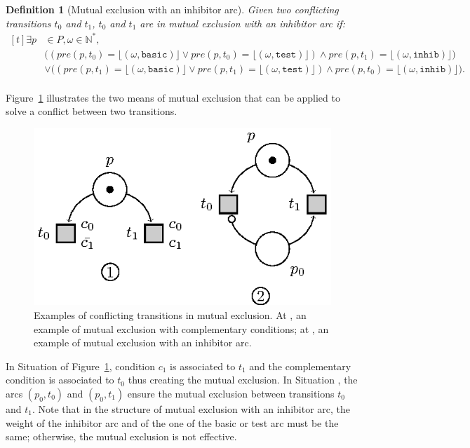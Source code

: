 \documentclass[pdflatex,sn-mathphys]{sn-jnl}%
\theoremstyle{thmstyleone}%
\theoremstyle{thmstyletwo}%
\theoremstyle{thmstylethree}%
\newtheorem{definition}{Definition}%
\begin{document}
\begin{definition}[Mutual exclusion with an inhibitor arc]
  \label{def:mutex-inhib} Given two conflicting transitions $t_0$ and
  $t_1$, $t_0$ and $t_1$ are in mutual exclusion with an inhibitor arc
  if:
  \begin{equation*}
    \begin{aligned}[t]
      \exists{}p&\in{}P,\omega\in{}\mathbb{N}^{*},\\
                &\big((pre(p,t_0)=\lfloor(\omega,\mathtt{basic})\rfloor\lor{}pre(p,t_0)=\lfloor(\omega,\mathtt{test})\rfloor)\land{}pre(p,t_1)=\lfloor(\omega,\mathtt{inhib})\rfloor\big)\\
                &\lor\big((pre(p,t_1)=\lfloor(\omega,\mathtt{basic})\rfloor\lor{}pre(p,t_1)=\lfloor(\omega,\mathtt{test})\rfloor)\land{}pre(p,t_0)=\lfloor(\omega,\mathtt{inhib})\rfloor\big).\\
    \end{aligned}
  \end{equation*}
\end{definition}

Figure~\ref{fig:mutex} illustrates the two means of mutual exclusion
that can be applied to solve a conflict between two transitions.
\begin{figure}[H]
  \centering
  \includegraphics[keepaspectratio,width=.4\linewidth]{mutex.eps}
  \caption[Examples of conflicting transitions in mutual exclusion.]{
    Examples of conflicting transitions in mutual exclusion. At
    , an example of mutual exclusion with complementary
    conditions; at , an example of mutual exclusion with an
    inhibitor arc.}
  \label{fig:mutex}
\end{figure}
In Situation  of Figure~\ref{fig:mutex}, condition $c_1$ is
associated to $t_1$ and the complementary condition is associated to
$t_0$ thus creating the mutual exclusion. In Situation ,
the arcs $(p_0,t_0)$ and $(p_0,t_1)$ ensure the mutual exclusion
between transitions $t_0$ and $t_1$. Note that in the structure of
mutual exclusion with an inhibitor arc, the weight of the inhibitor
arc and of the one of the basic or test arc must be the same;
otherwise, the mutual exclusion is not effective.\\
\end{document}

